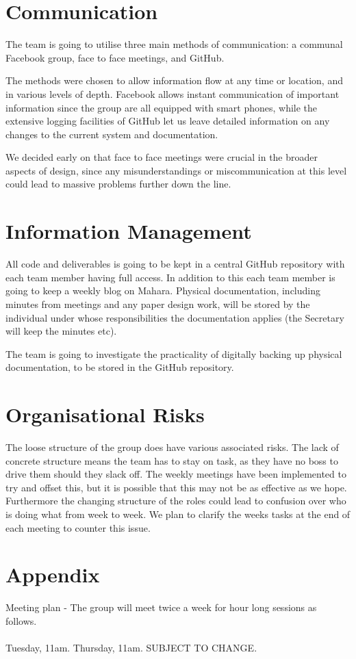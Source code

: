 \documentclass{l3deliverable}
\begin{document}
\section{Communication}
\label{sec:com}

The team is going to utilise three main methods of communication: a
communal Facebook group, face to face meetings, and GitHub.

The methods were chosen to allow information flow at any time or location,
and in various levels of depth. Facebook allows instant communication
of important information since the group are all equipped with
smart phones, while the extensive logging facilities of GitHub let us
leave detailed information on any changes to the current system and
documentation.

We decided early on that face to face meetings were
crucial in the broader aspects of design, since any misunderstandings
or miscommunication at this level could lead to massive problems
further down the line.

\section{Information Management}

All code and deliverables is going to be kept in a central GitHub repository 
with each team member having full access. In addition to this each team member
is going to keep a weekly blog on Mahara. Physical documentation,
including minutes from meetings and any paper design work, will be
stored by the individual under whose responsibilities the
documentation applies (the Secretary will keep the minutes etc).

The team is going to investigate the practicality of digitally backing up
physical documentation, to be stored in the GitHub repository.

\section{Organisational Risks}

The loose structure of the group does have various associated
risks. The lack of concrete structure means the team has to stay on
task, as they have no boss to drive them should they slack off. The
weekly meetings have been implemented to try and offset this, but it
is possible that this may not be as effective as we hope. Furthermore
the changing structure of the roles could lead to confusion over who
is doing what from week to week. We plan to clarify the weeks tasks at
the end of each meeting to counter this issue.

\pagebreak

\appendix

\section{Appendix}

Meeting plan - The group will meet twice a week for hour long sessions as follows.\\
\\
Tuesday, 11am. Thursday, 11am. SUBJECT TO CHANGE.
\end{document}
